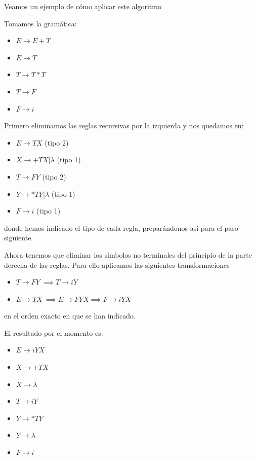 \documentclass{apuntes}
\begin{document}
Veamos un ejemplo de cómo aplicar este algoritmo
\begin{example}
Tomamos la gramática:
\begin{itemize}
\item $E \rightarrow E+T$
\item $E \rightarrow T$
\item $T \rightarrow T*T$
\item $T \rightarrow F$
\item $F \rightarrow i$
\end{itemize}
Primero eliminamos las reglas recursivas por la izquierda y nos quedamos en:
\begin{itemize}
\item $E \rightarrow TX$ (tipo 2)
\item $X \rightarrow +TX|λ$ (tipo 1)
\item $T \rightarrow FY$ (tipo 2)
\item $Y \rightarrow *TY|λ$ (tipo 1)
\item $F \rightarrow i$ (tipo 1)
\end{itemize}
donde hemos indicado el tipo de cada regla, preparándonos así para el paso siguiente.

Ahora tenemos que eliminar los símbolos no terminales del principio de la parte derecha de las reglas. Para ello aplicamos las siguientes transformaciones
\begin{itemize}
\item $T \rightarrow FY \ \implies T \rightarrow iY$
\item $E \rightarrow TX \ \implies E \rightarrow FYX \implies F \rightarrow iYX$
\end{itemize}
en el orden exacto en que se han indicado.

El resultado por el momento es:
\begin{itemize}
\item $E \rightarrow iYX$
\item $X \rightarrow +TX$
\item $X \rightarrow λ$
\item $T \rightarrow iY$
\item $Y \rightarrow *TY$
\item $Y \rightarrow λ$
\item $F \rightarrow i$
\end{itemize}


\end{example}
\end{document}

